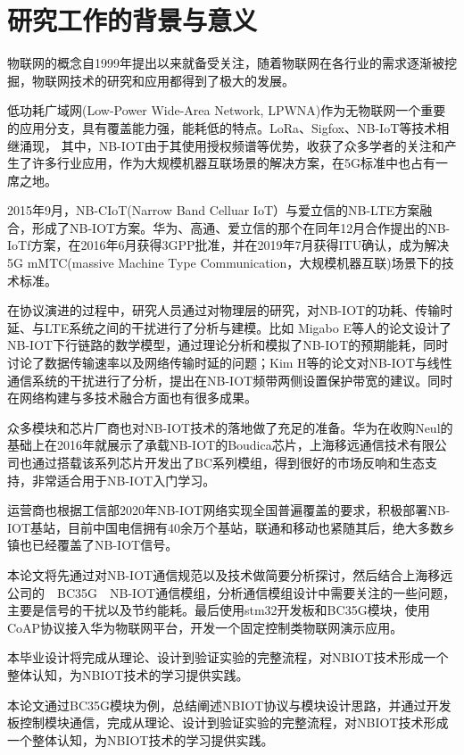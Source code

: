 \thesischapterexordium

\section{研究工作的背景与意义}

物联网的概念自1999年提出以来就备受关注，随着物联网在各行业的需求逐渐被挖掘，物联网技术的研究和应用都得到了极大的发展。


低功耗广域网(Low-Power Wide-Area Network, LPWNA)作为无物联网一个重要的应用分支，具有覆盖能力强，能耗低的特点。LoRa、Sigfox、NB-IoT等技术相继涌现\cite{hbydjs201905115}，
其中，NB-IOT由于其使用授权频谱等优势，收获了众多学者的关注和产生了许多行业应用，作为大规模机器互联场景的解决方案，在5G标准中也占有一席之地。

2015年9月，NB-CIoT(Narrow Band Celluar IoT）与爱立信的NB-LTE方案融合，形成了NB-IOT方案。华为、高通、爱立信的那个在同年12月合作提出的NB-IoTf方案，在2016年6月获得3GPP批准，并在2019年7月获得ITU确认，成为解决5G mMTC(massive Machine Type Communication，大规模机器互联)场景下的技术标准。

在协议演进的过程中，研究人员通过对物理层的研究，对NB-IOT的功耗、传输时延、与LTE系统之间的干扰进行了分析与建模。比如 Migabo E等人的论文\cite{8010279}设计了NB-IOT下行链路的数学模型，通过理论分析和模拟了NB-IOT的预期能耗，同时讨论了数据传输速率以及网络传输时延的问题；Kim H等的论文\cite{8539658,8436641}对NB-IOT与线性通信系统的干扰进行了分析，提出在NB-IOT频带两侧设置保护带宽的建议。同时在网络构建与多技术融合方面也有很多成果。

众多模块和芯片厂商也对NB-IOT技术的落地做了充足的准备。华为在收购Neul的基础上在2016年就展示了承载NB-IOT的Boudica芯片，上海移远通信技术有限公司也通过搭载该系列芯片开发出了BC系列模组，得到很好的市场反响和生态支持，非常适合用于NB-IOT入门学习。

运营商也根据工信部2020年NB-IOT网络实现全国普遍覆盖的要求，积极部署NB-IOT基站，目前中国电信拥有40余万个基站\cite{le2020zhong}，联通和移动也紧随其后，绝大多数乡镇也已经覆盖了NB-IOT信号。

本论文将先通过对NB-IOT通信规范以及技术做简要分析探讨，然后结合上海移远公司的　BC35G　NB-IOT通信模组，分析通信模组设计中需要关注的一些问题，主要是信号的干扰以及节约能耗。最后使用stm32开发板和BC35G模块，使用CoAP协议接入华为物联网平台，开发一个固定控制类物联网演示应用。

本毕业设计将完成从理论、设计到验证实验的完整流程，对NBIOT技术形成一个整体认知，为NBIOT技术的学习提供实践。

本论文通过BC35G模块为例，总结阐述NBIOT协议与模块设计思路，并通过开发板控制模块通信，完成从理论、设计到验证实验的完整流程，对NBIOT技术形成一个整体认知，为NBIOT技术的学习提供实践。

